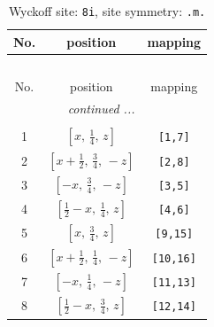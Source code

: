 \documentclass[fleqn,8pt]{jsarticle}
\begin{document}
\begin{longtable}{ccc}
\caption{Wyckoff site: {\tt 8i}, site symmetry: {\tt .m.}}
 \\
 \hline \hline
No. & position & mapping \\ \hline \endfirsthead

\multicolumn{2}{l}{\tablename\ \thetable{}} \\
 \hline \hline
No. & position & mapping \\ \hline \endhead

 \hline \hline
\multicolumn{2}{r}{\footnotesize\it continued ...} \\ \endfoot

 \hline \hline
\multicolumn{2}{r}{} \\ \endlastfoot

1 & $\left[ x,\, \frac{1}{4},\, z \right]$ & {\tt [1,7]} \\ \hline
2 & $\left[ x + \frac{1}{2},\, \frac{3}{4},\, - z \right]$ & {\tt [2,8]} \\ \hline
3 & $\left[ - x,\, \frac{3}{4},\, - z \right]$ & {\tt [3,5]} \\ \hline
4 & $\left[ \frac{1}{2} - x,\, \frac{1}{4},\, z \right]$ & {\tt [4,6]} \\ \hline
5 & $\left[ x,\, \frac{3}{4},\, z \right]$ & {\tt [9,15]} \\ \hline
6 & $\left[ x + \frac{1}{2},\, \frac{1}{4},\, - z \right]$ & {\tt [10,16]} \\ \hline
7 & $\left[ - x,\, \frac{1}{4},\, - z \right]$ & {\tt [11,13]} \\ \hline
8 & $\left[ \frac{1}{2} - x,\, \frac{3}{4},\, z \right]$ & {\tt [12,14]} \\
\end{longtable}
\renewcommand{\arraystretch}{1.2}
\end{document}
